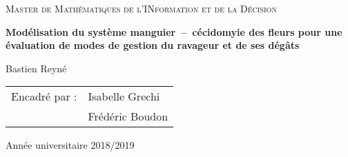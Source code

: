 
\begin{titlingpage}


\vspace*{2.5cm}

\begin{center}
 
 {\large \textsc{Master de Mathématiques de l'INformation et de la Décision}}
 
 \vspace*{2cm}
 
 
 {\LARGE \textbf{Modélisation du système manguier~--~cécidomyie des fleurs pour une évaluation de modes de gestion du ravageur et de ses dégâts}}
 \vspace*{1cm}
 
 Bastien Reyné
 
\end{center}

\vspace*{2cm}

\begin{tabular}{ll}
Encadré par : & Isabelle Grechi\\
 & Frédéric Boudon
\end{tabular}

\vspace*{2cm}

\begin{center}
\end{center}



\vfill

\begin{center}
 Année universitaire 2018/2019
\end{center}


\end{titlingpage}
